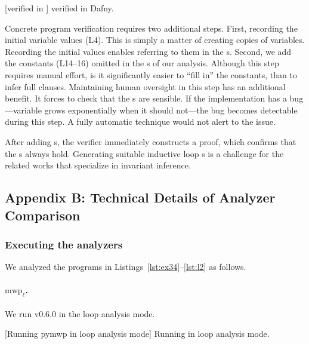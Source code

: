 \begin{center}
\begin{minipage}{\textwidth}
\captionsetup{type=lstlisting}
[\exname verified in ]
{\exname verified in Dafny.}
\label{lst:dafny-ex}
\end{minipage}
\end{center}

Concrete program verification requires two additional steps. First, recording
the initial variable values (L4). This is simply a matter of creating copies of
variables. Recording the initial values enables referring to them in the
s. Second, we add the constants (L14--16) omitted in the
s of our analysis. Although this step requires manual effort,
is it significantly easier to \enquote{fill in} the constants, than to infer
full  clauses. Maintaining human oversight in this step has an
additional benefit. It forces to check that the s are sensible.
If the implementation has a bug---\eg variable grows exponentially when it
should not---the bug becomes detectable during this step. A fully automatic
technique would not alert to the issue.

After adding s, the  verifier immediately constructs a
proof, which confirms that the s always hold. Generating suitable
inductive loop s
is a challenge for the related works that specialize in invariant
inference.

\subsection{Appendix B: Technical Details of Analyzer Comparison}
\label{app:sec:comparison}

\subsubsection{Executing the analyzers}\label{subsec:analyzers}

We analyzed the programs in Listings~\ref{lst:ex34}--\ref{lst:l2} as follows.

\paragraph*{$\text{mwp}_\ell$.}
We run  v0.6.0 in the loop analysis mode.
\begin{center}
\begin{minipage}{\textwidth}
\captionsetup{type=lstlisting}
[Running pymwp in loop analysis mode]
{Running  in loop analysis mode.}
\label{lst:mwp-bash}
\end{minipage}
\end{center}

